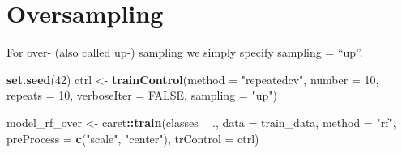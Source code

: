 \documentclass[]{book}
\newenvironment{Shaded}{\begin{snugshade}}{\end{snugshade}}
\newcommand{\DataTypeTok}[1]{\textcolor[rgb]{0.13,0.29,0.53}{#1}}
\newcommand{\DecValTok}[1]{\textcolor[rgb]{0.00,0.00,0.81}{#1}}
\newcommand{\FloatTok}[1]{\textcolor[rgb]{0.00,0.00,0.81}{#1}}
\newcommand{\KeywordTok}[1]{\textcolor[rgb]{0.13,0.29,0.53}{\textbf{#1}}}
\newcommand{\NormalTok}[1]{#1}
\newcommand{\OperatorTok}[1]{\textcolor[rgb]{0.81,0.36,0.00}{\textbf{#1}}}
\newcommand{\OtherTok}[1]{\textcolor[rgb]{0.56,0.35,0.01}{#1}}
\newcommand{\StringTok}[1]{\textcolor[rgb]{0.31,0.60,0.02}{#1}}
\begin{document}
\hypertarget{oversampling}{%
\section{Oversampling}\label{oversampling}}

For over- (also called up-) sampling we simply specify sampling = ``up''.

\begin{Shaded}
\begin{Highlighting}[]
\KeywordTok{set.seed}\NormalTok{(}\DecValTok{42}\NormalTok{)}
\NormalTok{ctrl <-}\StringTok{ }\KeywordTok{trainControl}\NormalTok{(}\DataTypeTok{method =} \StringTok{"repeatedcv"}\NormalTok{, }
                     \DataTypeTok{number =} \DecValTok{10}\NormalTok{, }
                     \DataTypeTok{repeats =} \DecValTok{10}\NormalTok{, }
                     \DataTypeTok{verboseIter =} \OtherTok{FALSE}\NormalTok{,}
                     \DataTypeTok{sampling =} \StringTok{"up"}\NormalTok{)}


\NormalTok{model_rf_over <-}\StringTok{ }\NormalTok{caret}\OperatorTok{::}\KeywordTok{train}\NormalTok{(classes }\OperatorTok{~}\StringTok{ }\NormalTok{.,}
                         \DataTypeTok{data =}\NormalTok{ train_data,}
                         \DataTypeTok{method =} \StringTok{"rf"}\NormalTok{,}
                         \DataTypeTok{preProcess =} \KeywordTok{c}\NormalTok{(}\StringTok{"scale"}\NormalTok{, }\StringTok{"center"}\NormalTok{),}
                         \DataTypeTok{trControl =}\NormalTok{ ctrl)}
\end{Highlighting}
\end{Shaded}

\begin{Shaded}
\end{Shaded}
\end{document}
